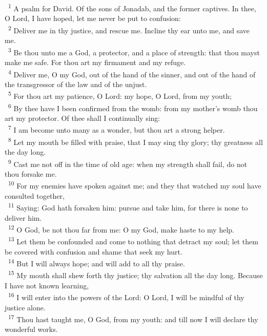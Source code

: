 \documentclass[a5paper,12pt]{article}
\begin{document}
\begin{multicols*}{2}
~\textsuperscript{1} A psalm for David. Of the sons of Jonadab, and the former captives. In thee, O Lord, I have hoped, let me never be put to confusion:\\
~\textsuperscript{2} Deliver me in thy justice, and rescue me. Incline thy ear unto me, and save me.\\
~\textsuperscript{3} Be thou unto me a God, a protector, and a place of strength: that thou mayst make me safe. For thou art my firmament and my refuge.\\
~\textsuperscript{4} Deliver me, O my God, out of the hand of the sinner, and out of the hand of the transgressor of the law and of the unjust.\\
~\textsuperscript{5} For thou art my patience, O Lord: my hope, O Lord, from my youth;\\
~\textsuperscript{6} By thee have I been confirmed from the womb: from my mother's womb thou art my protector. Of thee shall I continually sing:\\
~\textsuperscript{7} I am become unto many as a wonder, but thou art a strong helper.\\
~\textsuperscript{8} Let my mouth be filled with praise, that I may sing thy glory; thy greatness all the day long.\\
~\textsuperscript{9} Cast me not off in the time of old age: when my strength shall fail, do not thou forsake me.\\
~\textsuperscript{10} For my enemies have spoken against me; and they that watched my soul have consulted together,\\
~\textsuperscript{11} Saying: God hath forsaken him: pursue and take him, for there is none to deliver him.\\
~\textsuperscript{12} O God, be not thou far from me: O my God, make haste to my help.\\
~\textsuperscript{13} Let them be confounded and come to nothing that detract my soul; let them be covered with confusion and shame that seek my hurt.\\
~\textsuperscript{14} But I will always hope; and will add to all thy praise.\\
~\textsuperscript{15} My mouth shall shew forth thy justice; thy salvation all the day long. Because I have not known learning,\\
~\textsuperscript{16} I will enter into the powers of the Lord: O Lord, I will be mindful of thy justice alone.\\
~\textsuperscript{17} Thou hast taught me, O God, from my youth: and till now I will declare thy wonderful works.\\

\end{multicols*}
\end{document}
